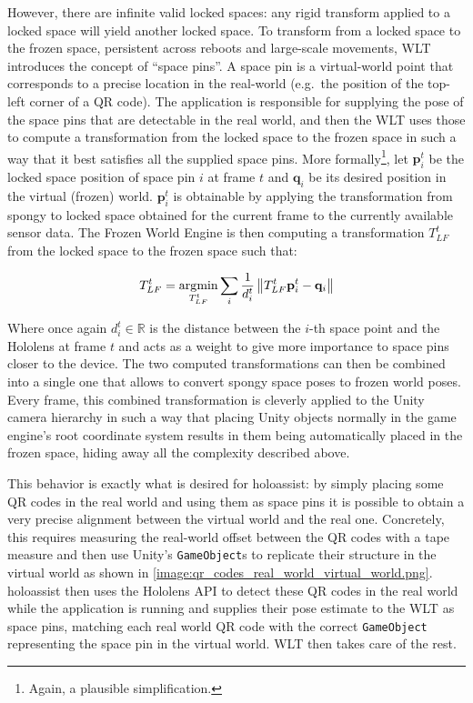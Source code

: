 However, there are infinite valid locked spaces: any rigid transform applied to a locked space will yield another locked space. To transform from a locked space to the frozen space, persistent across reboots and large-scale movements, \gls{WLT} introduces the concept of \enquote{space pins}. A space pin is a virtual-world point that corresponds to a precise location in the real-world (e.g.\ the position of the top-left corner of a QR code). The application is responsible for supplying the pose of the space pins that are detectable in the real world, and then the \gls{WLT} uses those to compute a transformation from the locked space to the frozen space in such a way that it best satisfies all the supplied space pins. More formally\footnote{Again, a plausible simplification.}, let $\mathbf{p}_i^{t}$ be the locked space position of space pin $i$ at frame $t$ and $\mathbf{q}_i$ be its desired position in the virtual (frozen) world. $\mathbf{p}_i^t$ is obtainable by applying the transformation from spongy to locked space obtained for the current frame to the currently available sensor data. The Frozen World Engine is then computing a transformation $T_{LF}^t$ from the locked space to the frozen space such that:

\begin{equation}
T_{LF}^t = \operatorname*{\arg\!\min}_{T_{LF}^t} \sum_i \frac{1}{d_i^t}\left\lVert T_{LF}^t \mathbf{p}_i^t - \mathbf{q}_i\right\rVert
\end{equation}

Where once again $d_i^t \in \mathbb{R}$ is the distance between the $i$-th space point and the Hololens at frame $t$ and acts as a weight to give more importance to space pins closer to the device. The two computed transformations can then be combined into a single one that allows to convert spongy space poses to frozen world poses. Every frame, this combined transformation is cleverly applied to the Unity camera hierarchy in such a way that placing Unity objects normally in the game engine's root coordinate system results in them being automatically placed in the frozen space, hiding away all the complexity described above.

This behavior is exactly what is desired for \gls{holoassist}: by simply placing some QR codes in the real world and using them as space pins it is possible to obtain a very precise alignment between the virtual world and the real one. Concretely, this requires measuring the real-world offset between the QR codes with a tape measure and then use Unity's \texttt{GameObject}s to replicate their structure in the virtual world as shown in \autoref{image:qr_codes_real_world_virtual_world.png}. \gls{holoassist} then uses the Hololens \gls{API} to detect these QR codes in the real world while the application is running and supplies their pose estimate to the \gls{WLT} as space pins, matching each real world QR code with the correct \texttt{GameObject} representing the space pin in the virtual world. \gls{WLT} then takes care of the rest.

